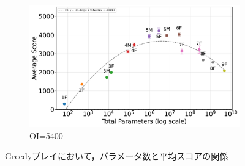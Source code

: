 \begin{figure}[t]
    \vspace{1em}
    \begin{subfigure}[b]{\linewidth}
        \centering
        \includegraphics[width=\linewidth]{pdf/parameter_performance_plots/params_performance_OI5400_EXP1.pdf}
        \caption{OI=5400}
        \label{fig:score_vs_tuple_OI5400}
    \end{subfigure}

    \caption{Greedyプレイにおいて，パラメータ数と平均スコアの関係}
    \label{fig:score_vs_tuple_all}
\end{figure}

